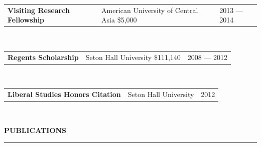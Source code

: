 \documentclass{resume} %
\begin{document}
\begin{minipage}{\textwidth}



\begin{tabular}{@{}p{}p{}@{}p{}@{}}
{\bf Visiting Research Fellowship}
  &
{\footnotesize American University of Central Asia \hfill \$5,000\hspace{0.5cm}}
&
\hfill {2013 --- 2014}
\end{tabular}
\\


\begin{tabular}{@{}p{}p{}@{}p{}@{}}
{\bf Regents Scholarship}
  &
 {\footnotesize Seton Hall University \hfill \${111,140}\hspace{0.5cm}}
  &
 \hfill {2008 --- 2012}
\end{tabular}
\\


\begin{tabular}{@{}p{}p{}@{}p{}@{}}
{\bf Liberal Studies Honors Citation}
  &
 {\footnotesize Seton Hall University} \hfill
  &
 \hfill {2012}
\end{tabular}
\\

\end{minipage}


\newpage

\vspace{.5cm}
\sectionskip
\MakeUppercase{\textbf{Publications}}
  \sectionlineskip
  \hrule
\vspace{.5cm}
\end{document}
